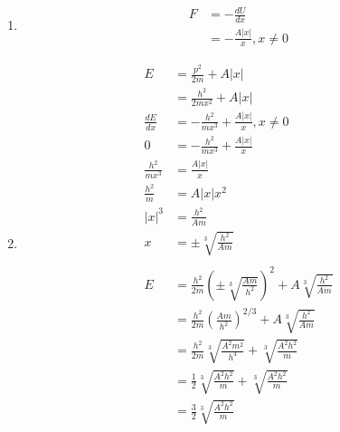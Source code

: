 \documentclass{article}
\begin{document}
\setcounter{subsubsection}{80}
\subsubsection{}

\begin{enumerate}
  \item

        \begin{align*}
          F & = -\frac{d U}{d x}          \\
            & = -\frac{A |x|}{x}, x \ne 0
        \end{align*}

  \item

        \begin{align*}
          E                 & = \frac{p^2}{2 m} + A |x|                                                                      \\
                            & = \frac{h^2}{2 m x^2} + A |x|                                                                  \\
          \frac{d E}{d x}   & = -\frac{h^2}{m x^3} + \frac{A |x|}{x}, x \ne 0                                                \\
          0                 & = -\frac{h^2}{m x^3} + \frac{A |x|}{x}                                                         \\
          \frac{h^2}{m x^3} & = \frac{A |x|}{x}                                                                              \\
          \frac{h^2}{m}     & = A |x| x^2                                                                                    \\
          |x|^3             & = \frac{h^2}{A m}                                                                              \\
          x                 & = \pm \sqrt[3]{\frac{h^2}{A m}}                                                                \\ \\
          E                 & = \frac{h^2}{2 m} \left( \pm \sqrt[3]{\frac{A m}{h^2}} \right)^2 + A \sqrt[3]{\frac{h^2}{A m}} \\
                            & = \frac{h^2}{2 m} \left( \frac{A m}{h^2} \right)^{2 / 3} + A \sqrt[3]{\frac{h^2}{A m}}         \\
                            & = \frac{h^2}{2 m} \sqrt[3]{\frac{A^2 m^2}{h^4}} + \sqrt[3]{\frac{A^2 h^2}{m}}                  \\
                            & = \frac{1}{2} \sqrt[3]{\frac{A^2 h^2}{m}} + \sqrt[3]{\frac{A^2 h^2}{m}}                        \\
                            & = \frac{3}{2} \sqrt[3]{\frac{A^2 h^2}{m}}
        \end{align*}
\end{enumerate}
\end{document}
